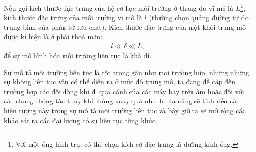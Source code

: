\documentclass[../../../main.tex]{subfiles}
\begin{document}
    Nếu gọi kích thước đặc trưng của hệ cơ học môi trường ở thang đo vĩ mô là $L$\footnote{Với một ống hình trụ, có thể chọn kích cở đặc trưng là đường kính ống.}, kích thước đặc trưng của môi trường vi mô là $l$ (thường chọn quảng đường tự do trung bình của phân tử lưu chất). Kích thước đặc trưng của một khối trung mô được kí hiệu là $\delta$ phải thoả mãn:
        \begin{align}
            l\ll\delta\ll L,
        \end{align}
    để sự mô hình hóa môi trường liên tục là khả dĩ.

    Sự mô tả môi trường liên tục là tốt trong gần như mọi trường hợp, nhưng những sự không liên tục vẫn có thể diễn ra ở mức độ trung mô, ta đang đề cập đến trường hợp các  đối dòng khí đi qua cánh của  các máy bay trên âm hoặc  đối với các chong chóng tàu thủy khi chúng xoay quá nhanh. Ta cũng sẽ tính đến các hiện tượng này trong sự mô tả môi trường liên tục và bây giờ ta sẽ mở rộng các khảo sát ra các đại lượng có sự liên tục từng khúc.
\end{document}
